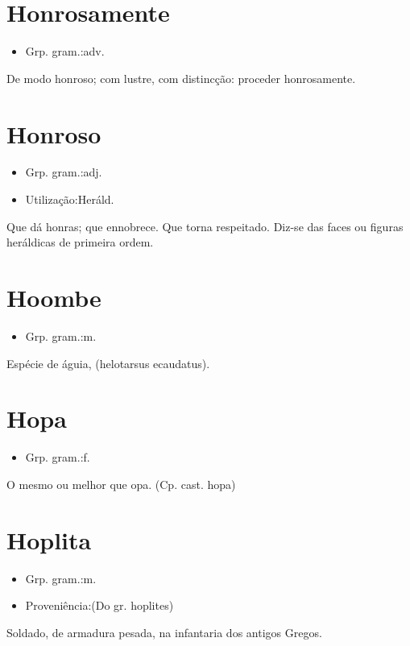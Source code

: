 \documentclass{article}
\begin{document}
\section{Honrosamente}
\begin{itemize}
\item {Grp. gram.:adv.}
\end{itemize}
De modo honroso; com lustre, com distincção: \textunderscore proceder honrosamente\textunderscore .
\section{Honroso}
\begin{itemize}
\item {Grp. gram.:adj.}
\end{itemize}
\begin{itemize}
\item {Utilização:Heráld.}
\end{itemize}
Que dá honras; que ennobrece.
Que torna respeitado.
Diz-se das faces ou figuras heráldicas de primeira ordem.
\section{Hoombe}
\begin{itemize}
\item {Grp. gram.:m.}
\end{itemize}
Espécie de águia, (\textunderscore helotarsus ecaudatus\textunderscore ).
\section{Hopa}
\begin{itemize}
\item {Grp. gram.:f.}
\end{itemize}
O mesmo ou melhor que \textunderscore opa\textunderscore .
(Cp. cast. \textunderscore hopa\textunderscore )
\section{Hoplita}
\begin{itemize}
\item {Grp. gram.:m.}
\end{itemize}
\begin{itemize}
\item {Proveniência:(Do gr. \textunderscore hoplites\textunderscore )}
\end{itemize}
Soldado, de armadura pesada, na infantaria dos antigos Gregos.
\end{document}

